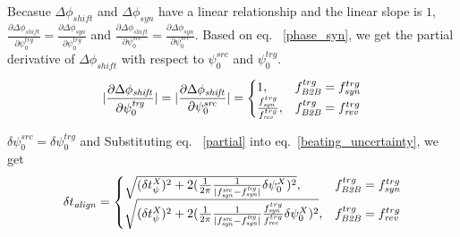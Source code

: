 \begin{itemize}
Becasue $\Delta \phi_\mathit{shift}$ and $\Delta \phi_\mathit{syn}$ have a linear relationship and the linear slope is $1$, $\frac {\partial \Delta \phi_\mathit{shift}}{\partial \psi^\mathit{trg}_0}=\frac {\partial \Delta \phi_\mathit{syn}}{\partial \psi^\mathit{trg}_0}$ and $\frac {\partial \Delta \phi_\mathit{shift}}{\partial \psi^\mathit{src}_0}=\frac {\partial \Delta \phi_\mathit{syn}}{\partial \psi^\mathit{src}_0}$. Based on eq. ~\ref{phase_syn}, we get the partial derivative of $\Delta \phi_\mathit{shift}$ with respect to $\psi^\mathit{src}_0$ and $\psi^\mathit{trg}_0$.
\begin{eqnarray}\label{partial}
|\frac {\partial \Delta \phi_\mathit{shift}}{\partial \psi^\mathit{trg}_0}| = |\frac {\partial \Delta \phi_\mathit{shift}}{\partial \psi^\mathit{src}_0}|=
\begin{cases}
1, &f_{\mathit{B2B}}^{trg}=f_{\mathit{syn}}^{trg}\cr
\frac{f_{\mathit{syn}}^{trg}}{f_{\mathit{rev}}^{trg}}, &f_{\mathit{B2B}}^{trg}=f_{\mathit{rev}}^{trg}\cr
\end{cases}
\end{eqnarray}

$\delta  \psi^\mathit{src}_0=\delta  \psi^\mathit{trg}_0$ and Substituting eq. ~\ref{partial} into eq.~\ref{beating_uncertainty}, we get 
\begin{eqnarray}
\delta t_\mathit{align}=
\begin{cases}
\sqrt {(\delta t_\psi^\mathit{X})^2 +2(\frac{1}{2\pi}\frac{1}{|f_{\mathit{syn}}^\mathit{src}-f_{\mathit{syn}}^\mathit{trg}|} \delta  \psi^{X}_0)^2 }, &f_{\mathit{B2B}}^{trg}=f_{\mathit{syn}}^{trg}\cr
\sqrt {(\delta t_\psi^\mathit{X})^2 +2(\frac{1}{2\pi}\frac{1}{|f_{\mathit{syn}}^\mathit{src}-f_{\mathit{syn}}^\mathit{trg}|} \frac{f_{\mathit{syn}}^{trg}}{f_{\mathit{rev}}^{trg}}\delta  \psi^{X}_0)^2 }, &f_{\mathit{B2B}}^{trg}=f_{\mathit{rev}}^{trg}\cr
\end{cases}
\end{eqnarray}


\end{itemize}

